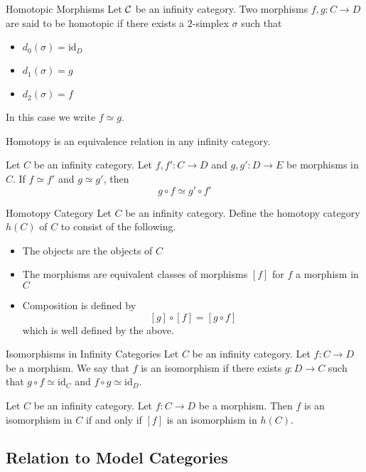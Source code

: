 \documentclass[a4paper]{article}
\begin{document}
\begin{defn}{Homotopic Morphisms}{} Let $\mathcal{C}$ be an infinity category. Two morphisms $f,g:C\to D$ are said to be homotopic if there exists a $2$-simplex $\sigma$ such that 
\begin{itemize}
\item $d_0(\sigma)=\text{id}_D$
\item $d_1(\sigma)=g$
\item $d_2(\sigma)=f$
\end{itemize}
In this case we write $f\simeq g$. 
\end{defn}

\begin{lmm}{}{} Homotopy is an equivalence relation in any infinity category. 
\end{lmm}

\begin{prp}{}{} Let $C$ be an infinity category. Let $f,f':C\to D$ and $g,g':D\to E$ be morphisms in $C$. If $f\simeq f'$ and $g\simeq g'$, then $$g\circ f\simeq g'\circ f'$$
\end{prp}

\begin{defn}{Homotopy Category}{} Let $C$ be an infinity category. Define the homotopy category $h(C)$ of $C$ to consist of the following. 
\begin{itemize}
\item The objects are the objects of $C$
\item The morphisms are equivalent classes of morphisms $[f]$ for $f$ a morphism in $C$
\item Composition is defined by $$[g]\circ[f]=[g\circ f]$$ which is well defined by the above. 
\end{itemize}
\end{defn}

\begin{defn}{Isomorphisms in Infinity Categories}{} Let $C$ be an infinity category. Let $f:C\to D$ be a morphism. We say that $f$ is an isomorphism if there exists $g:D\to C$ such that $g\circ f\simeq\text{id}_C$ and $f\circ g\simeq\text{id}_D$. 
\end{defn}

\begin{lmm}{}{} Let $C$ be an infinity category. Let $f:C\to D$ be a morphism. Then $f$ is an isomorphism in $C$ if and only if $[f]$ is an isomorphism in $h(C)$. 
\end{lmm}

\subsection{Relation to Model Categories}
\end{document}
